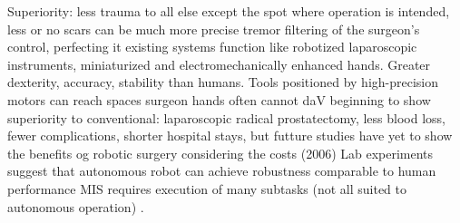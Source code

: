 Superiority:
less trauma to all else except the spot where operation is intended, less or no scars
can be much more precise
tremor filtering of the surgeon's control, perfecting it
existing systems function like robotized laparoscopic instruments, miniaturized and electromechanically enhanced hands. Greater dexterity, accuracy, stability than humans. Tools positioned by high-precision motors can reach spaces surgeon hands often cannot \citep{bib:docatadist}
daV beginning to show superiority to  conventional: laparoscopic radical prostatectomy, less blood loss, fewer complications, shorter hospital stays, but futture studies have yet to show the benefits og robotic surgery considering the costs (2006) \citep{bib:docatadist}
Lab experiments suggest that autonomous robot can achieve robustness comparable to human performance \citep{bib:raven_debride}
MIS requires execution of many subtasks (not all suited to autonomous operation) \citep{bib:raven_debride}.

